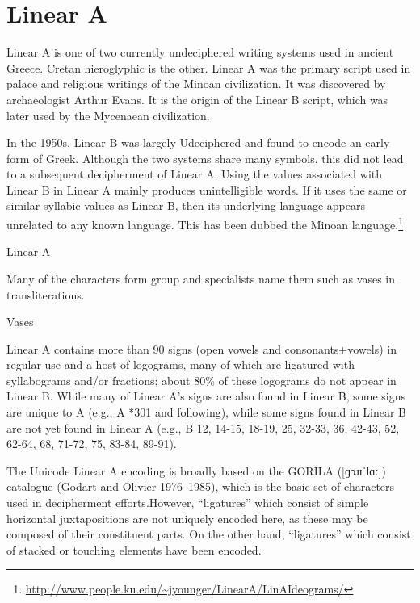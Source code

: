 \section{Linear A}
\label{s:lineara}
\newfontfamily{}

Linear A is one of two currently undeciphered writing systems used in ancient Greece. Cretan hieroglyphic is the other. Linear A was the primary script used in palace and religious writings of the Minoan civilization. It was discovered by archaeologist Arthur Evans. It is the origin of the Linear B script, which was later used by the Mycenaean civilization.

In the 1950s, Linear B was largely Udeciphered and found to encode an early form of Greek. Although the two systems share many symbols, this did not lead to a subsequent decipherment of Linear A. Using the values associated with Linear B in Linear A mainly produces unintelligible words. If it uses the same or similar syllabic values as Linear B, then its underlying language appears unrelated to any known language. This has been dubbed the Minoan language.\footnote{\url{http://www.people.ku.edu/~jyounger/LinearA/LinAIdeograms/}}

\begin{scriptexample}[]{Linear A}
\end{scriptexample}

Many of the characters form group and specialists name them such as vases in transliterations.

\begin{scriptexample}[]{Vases}
\begin{center}
\end{center}
\end{scriptexample}

Linear A contains more than 90 signs (open vowels and consonants+vowels) in regular use and a host of
logograms, many of which are ligatured with syllabograms and/or fractions; about 80\% of these
logograms do not appear in Linear B. While many of Linear A’s signs are also found in Linear B, some
signs are unique to A (e.g., A *301 and following), while some signs found in Linear B are not yet found
in Linear A (e.g., B 12, 14-15, 18-19, 25, 32-33, 36, 42-43, 52, 62-64, 68, 71-72, 75, 83-84, 89-91).

The Unicode Linear A encoding is broadly based on the GORILA ([{\arial ɡɔɹɪˈlɑː}]) catalogue
(Godart and Olivier 1976–1985), which is the basic set of characters used in decipherment efforts.However, “ligatures” which consist of simple horizontal juxtapositions are not uniquely encoded here, as
these may be composed of their constituent parts. On the other hand, “ligatures” which consist of stacked
or touching elements have been encoded. 





